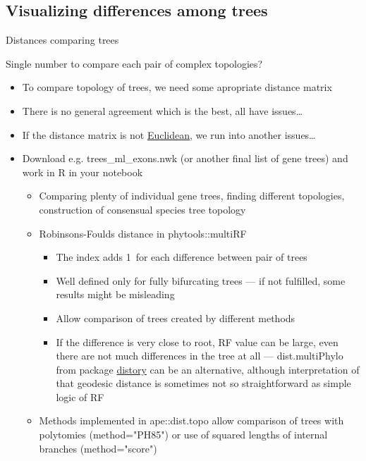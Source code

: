 \documentclass[compress,  xelatex, 11pt, xcolor=x11names, aspectratio=169,
	hyperref={
		bookmarks=true,
		unicode=true,
		colorlinks=true,
		pdftitle={HybSeq course},
		plainpages=false,
		pdfauthor={Vojtech Zeisek},
		pdfsubject={Practical processing of HybSeq target enrichment sequencing data on computing grids like MetaCentrum},
		pdfcreator={XeLaTeX},
		pdfkeywords={BASH, command line, GNU, HybSeq, Linux, MetaCentrum, sequencing shell, target enrichment},
		linkcolor=Turquoise4, %
		anchorcolor=DodgerBlue4, %
		citecolor=DodgerBlue4, %
		filecolor=DodgerBlue4, %
		menucolor=Tan4, %
		urlcolor=DarkOliveGreen4 %
		},
	url={hyphens, lowtilde} %
	]{beamer}
\renewcommand{\texttt}[1]{\colorbox{Cornsilk2}{{\ttfamily #1}}}
\begin{document}
\subsection{Visualizing differences among trees}

\begin{frame}[allowframebreaks]{Distances comparing trees}
	\label{treesdists}
	\begin{alertblock}{Single number to compare each pair of complex topologies?}
		\begin{itemize}
			\item To compare topology of trees, we need some apropriate distance matrix
			\item There is no general agreement which is the best, all have issues\ldots
			\item If the distance matrix is not \href{https://en.wikipedia.org/wiki/Euclidean_distance_matrix}{Euclidean}, we run into another issues\ldots
		\end{itemize}
	\end{alertblock}
	\begin{itemize}
		\item Download e.g. \texttt{trees\_ml\_exons.nwk} (or another final list of gene trees) and work in \texttt{R} in your notebook
		\begin{itemize}
			\item Comparing plenty of individual gene trees, finding different topologies, construction of consensual species tree topology
			\item Robinsons-Foulds distance in \texttt{phytools::multiRF}
			\begin{itemize}
				\item The index adds 1~for each difference between pair of trees
				\item Well defined only for fully bifurcating trees --- if not fulfilled, some results might be misleading
				\item Allow comparison of trees created by different methods
				\item If the difference is very close to root, RF value can be large, even there are not much differences in the tree at all --- \texttt{dist.multiPhylo} from package \href{https://CRAN.R-project.org/package=distory}{distory} can be an alternative, although interpretation of that geodesic distance is sometimes not so straightforward as simple logic of RF
			\end{itemize}
			\item Methods implemented in \texttt{ape::dist.topo} allow comparison of trees with polytomies (\texttt{method="PH85"}) or use of squared lengths of internal branches (\texttt{method="score"})

\end{itemize}
\end{itemize}
\end{frame}
\end{document}
